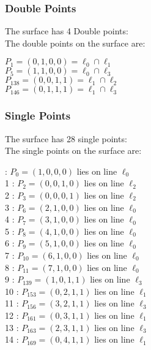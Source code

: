 \documentclass{article}
\begin{document}
{\subsubsection*{Double Points}
The surface has 4 Double points:\\
The double points on the surface are:\\
\begin{multicols}{2}
\noindent
$P_{1} = ( 0, 1, 0, 0 ) = \ell_{0} \cap \ell_{1} $\\
$P_{5} = ( 1, 1, 0, 0 ) = \ell_{0} \cap \ell_{3} $\\
$P_{138} = ( 0, 0, 1, 1 ) = \ell_{1} \cap \ell_{2} $\\
$P_{146} = ( 0, 1, 1, 1 ) = \ell_{1} \cap \ell_{3} $\\
\end{multicols}
\subsubsection*{Single Points}
The surface has 28 single points:\\
The single points on the surface are:\\
\begin{multicols}{2}
 : $P_{0}=( 1, 0, 0, 0 )$ lies on line $\ell_{0}$\\
1 : $P_{2}=( 0, 0, 1, 0 )$ lies on line $\ell_{2}$\\
2 : $P_{3}=( 0, 0, 0, 1 )$ lies on line $\ell_{2}$\\
3 : $P_{6}=( 2, 1, 0, 0 )$ lies on line $\ell_{0}$\\
4 : $P_{7}=( 3, 1, 0, 0 )$ lies on line $\ell_{0}$\\
5 : $P_{8}=( 4, 1, 0, 0 )$ lies on line $\ell_{0}$\\
6 : $P_{9}=( 5, 1, 0, 0 )$ lies on line $\ell_{0}$\\
7 : $P_{10}=( 6, 1, 0, 0 )$ lies on line $\ell_{0}$\\
8 : $P_{11}=( 7, 1, 0, 0 )$ lies on line $\ell_{0}$\\
9 : $P_{139}=( 1, 0, 1, 1 )$ lies on line $\ell_{3}$\\
10 : $P_{153}=( 0, 2, 1, 1 )$ lies on line $\ell_{1}$\\
11 : $P_{156}=( 3, 2, 1, 1 )$ lies on line $\ell_{3}$\\
12 : $P_{161}=( 0, 3, 1, 1 )$ lies on line $\ell_{1}$\\
13 : $P_{163}=( 2, 3, 1, 1 )$ lies on line $\ell_{3}$\\
14 : $P_{169}=( 0, 4, 1, 1 )$ lies on line $\ell_{1}$\\

\end{multicols}}
\end{document}
